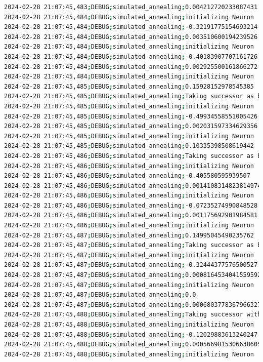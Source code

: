 \documentclass{article}
\begin{document}
\begin{lstlisting}[language=bash, caption=Example Output of Program]
2024-02-28 21:07:45,483;DEBUG;simulated_annealing;0.004212720233087431
2024-02-28 21:07:45,484;DEBUG;simulated_annealing;initializing Neuron
2024-02-28 21:07:45,484;DEBUG;simulated_annealing;-0.32191775154693214
2024-02-28 21:07:45,484;DEBUG;simulated_annealing;0.003510600194239526
2024-02-28 21:07:45,484;DEBUG;simulated_annealing;initializing Neuron
2024-02-28 21:07:45,484;DEBUG;simulated_annealing;-0.40183907707161726
2024-02-28 21:07:45,484;DEBUG;simulated_annealing;0.002925500161866272
2024-02-28 21:07:45,484;DEBUG;simulated_annealing;initializing Neuron
2024-02-28 21:07:45,485;DEBUG;simulated_annealing;0.15928152978545385
2024-02-28 21:07:45,485;DEBUG;simulated_annealing;Taking successor as better option (exploitation)
2024-02-28 21:07:45,485;DEBUG;simulated_annealing;initializing Neuron
2024-02-28 21:07:45,485;DEBUG;simulated_annealing;-0.49934558551005426
2024-02-28 21:07:45,485;DEBUG;simulated_annealing;0.002031597334629356
2024-02-28 21:07:45,485;DEBUG;simulated_annealing;initializing Neuron
2024-02-28 21:07:45,485;DEBUG;simulated_annealing;0.10335398508619442
2024-02-28 21:07:45,486;DEBUG;simulated_annealing;Taking successor as better option (exploitation)
2024-02-28 21:07:45,486;DEBUG;simulated_annealing;initializing Neuron
2024-02-28 21:07:45,486;DEBUG;simulated_annealing;-0.405580595939507
2024-02-28 21:07:45,486;DEBUG;simulated_annealing;0.0014108314823814974
2024-02-28 21:07:45,486;DEBUG;simulated_annealing;initializing Neuron
2024-02-28 21:07:45,486;DEBUG;simulated_annealing;-0.07235274990848528
2024-02-28 21:07:45,486;DEBUG;simulated_annealing;0.001175692901984581
2024-02-28 21:07:45,486;DEBUG;simulated_annealing;initializing Neuron
2024-02-28 21:07:45,487;DEBUG;simulated_annealing;0.14995045490235762
2024-02-28 21:07:45,487;DEBUG;simulated_annealing;Taking successor as better option (exploitation)
2024-02-28 21:07:45,487;DEBUG;simulated_annealing;initializing Neuron
2024-02-28 21:07:45,487;DEBUG;simulated_annealing;-0.32444377576500527
2024-02-28 21:07:45,487;DEBUG;simulated_annealing;0.0008164534041559592
2024-02-28 21:07:45,487;DEBUG;simulated_annealing;initializing Neuron
2024-02-28 21:07:45,487;DEBUG;simulated_annealing;0.0
2024-02-28 21:07:45,487;DEBUG;simulated_annealing;0.0006803778367966327
2024-02-28 21:07:45,488;DEBUG;simulated_annealing;Taking successor with probability 100% (exploration)
2024-02-28 21:07:45,488;DEBUG;simulated_annealing;initializing Neuron
2024-02-28 21:07:45,488;DEBUG;simulated_annealing;-0.12029883613240247
2024-02-28 21:07:45,488;DEBUG;simulated_annealing;0.0005669815306638605
2024-02-28 21:07:45,488;DEBUG;simulated_annealing;initializing Neuron

\end{lstlisting}
\end{document}
